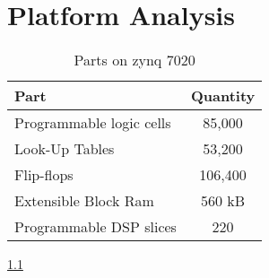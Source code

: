 \chapter{Platform Analysis} \label{ch:plaanalysis}

\begin{table}
  \centering
  \begin{tabular}{l c}
  \toprule
  \textbf{Part} & \textbf{Quantity} \\
  \toprule
  Programmable logic cells &  85,000\\
  \midrule
  Look-Up Tables & 53,200\\
  \midrule
  Flip-flops & 106,400\\
  \midrule
  Extensible Block Ram  & 560 kB\\
  \midrule
  Programmable DSP slices & 220 \\
  \bottomrule
  \end{tabular}
  \caption{Parts on zynq 7020}
  \label{tb:z7020-parts}
\end{table}
\ref{tb:z7020-parts}

